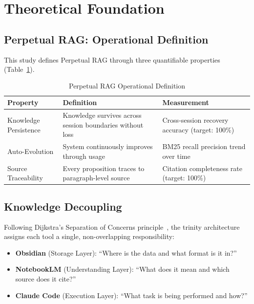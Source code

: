 \documentclass[conference]{IEEEtran}
\begin{document}
\section{Theoretical Foundation}

\subsection{Perpetual RAG: Operational Definition}

This study defines Perpetual RAG through three quantifiable properties
(Table~\ref{tab:definition}).

\begin{table}[ht]
\caption{Perpetual RAG Operational Definition}
\label{tab:definition}
\centering
\begin{tabular}{p{1.8cm}p{2.8cm}p{2.8cm}}
\toprule
\textbf{Property} & \textbf{Definition} & \textbf{Measurement} \\
\midrule
Knowledge Persistence &
  Knowledge survives across session boundaries without loss &
  Cross-session recovery accuracy (target: 100\%) \\[4pt]
Auto-Evolution &
  System continuously improves through usage &
  BM25 recall precision trend over time \\[4pt]
Source Traceability &
  Every proposition traces to paragraph-level source &
  Citation completeness rate (target: 100\%) \\
\bottomrule
\end{tabular}
\end{table}

\subsection{Knowledge Decoupling}

Following Dijkstra's Separation of Concerns principle~\cite{dijkstra1982soc},
the trinity architecture assigns each tool a single, non-overlapping
responsibility:

\begin{itemize}
  \item \textbf{Obsidian} (Storage Layer): ``Where is the data and what
        format is it in?''
  \item \textbf{NotebookLM} (Understanding Layer): ``What does it mean and
        which source does it cite?''
  \item \textbf{Claude Code} (Execution Layer): ``What task is being
        performed and how?''
\end{itemize}
\end{document}
